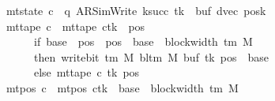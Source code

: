 \begin{isabellebody}
\ \ \ \ \ \ \ \ \ \ \ \ \ \ {\isasymand}\ mt{\isacharunderscore}{\kern0pt}state\ c{\isacharprime}{\kern0pt}{\isacharprime}{\kern0pt}\ {\isacharequal}{\kern0pt}\ {\isacharparenleft}{\kern0pt}q{\isacharcomma}{\kern0pt}\ AR{\isacharunderscore}{\kern0pt}SimWrite{\isacharcomma}{\kern0pt}\ k{\isacharunderscore}{\kern0pt}succ\ tk{\isacharcomma}{\kern0pt}\ {}{\isacharcomma}{\kern0pt}\ buf{\isacharcomma}{\kern0pt}\ dvec{\isacharcomma}{\kern0pt}\ posk{\isacharparenright}{\kern0pt}\isanewline
\ \ \ \ \ \ \ \ \ \ \ \ \ \ {\isasymand}\ mt{\isacharunderscore}{\kern0pt}tape\ c{\isacharprime}{\kern0pt}{\isacharprime}{\kern0pt}\ {\isacharequal}{\kern0pt}\ {\isacharparenleft}{\kern0pt}mt{\isacharunderscore}{\kern0pt}tape\ c{\isacharprime}{\kern0pt}{\isacharparenright}{\kern0pt}{\isacharparenleft}{\kern0pt}tk\ {\isacharcolon}{\kern0pt}{\isacharequal}{\kern0pt}\ {\isacharparenleft}{\kern0pt}{\isasymlambda}pos{\isachardot}{\kern0pt}\isanewline
\ \ \ \ \ \ \ \ \ \ \ \ \ \ \ \ \ \ \ \ if\ base\ {\isasymle}\ pos\ {\isasymand}\ pos\ {\isacharless}{\kern0pt}\ base\ {\isacharplus}{\kern0pt}\ block{\isacharunderscore}{\kern0pt}width\ {\isacharparenleft}{\kern0pt}{\isasymGamma}{\isacharunderscore}{\kern0pt}tm\ M{\isacharparenright}{\kern0pt}\isanewline
\ \ \ \ \ \ \ \ \ \ \ \ \ \ \ \ \ \ \ \ then\ write{\isacharunderscore}{\kern0pt}bit\ {\isacharparenleft}{\kern0pt}{\isasymGamma}{\isacharunderscore}{\kern0pt}tm\ M{\isacharparenright}{\kern0pt}\ {\isacharparenleft}{\kern0pt}bl{\isacharunderscore}{\kern0pt}tm\ M{\isacharparenright}{\kern0pt}\ {\isacharparenleft}{\kern0pt}buf\ tk{\isacharparenright}{\kern0pt}\ {\isacharparenleft}{\kern0pt}pos\ {\isacharminus}{\kern0pt}\ base{\isacharparenright}{\kern0pt}\isanewline
\ \ \ \ \ \ \ \ \ \ \ \ \ \ \ \ \ \ \ \ else\ mt{\isacharunderscore}{\kern0pt}tape\ c{\isacharprime}{\kern0pt}\ tk\ pos{\isacharparenright}{\kern0pt}{\isacharparenright}{\kern0pt}\isanewline
\ \ \ \ \ \ \ \ \ \ \ \ \ \ {\isasymand}\ mt{\isacharunderscore}{\kern0pt}pos\ c{\isacharprime}{\kern0pt}{\isacharprime}{\kern0pt}\ {\isacharequal}{\kern0pt}\ {\isacharparenleft}{\kern0pt}mt{\isacharunderscore}{\kern0pt}pos\ c{\isacharprime}{\kern0pt}{\isacharparenright}{\kern0pt}{\isacharparenleft}{\kern0pt}tk\ {\isacharcolon}{\kern0pt}{\isacharequal}{\kern0pt}\ base\ {\isacharplus}{\kern0pt}\ block{\isacharunderscore}{\kern0pt}width\ {\isacharparenleft}{\kern0pt}{\isasymGamma}{\isacharunderscore}{\kern0pt}tm\ M{\isacharparenright}{\kern0pt}{\isacharparenright}{\kern0pt}{\isachardoublequoteclose}\isanewline
%
\isadelimproof
\ \ %
\endisadelimproof
%
\isatagproof
{}\isamarkupfalse%

\end{isabellebody}
